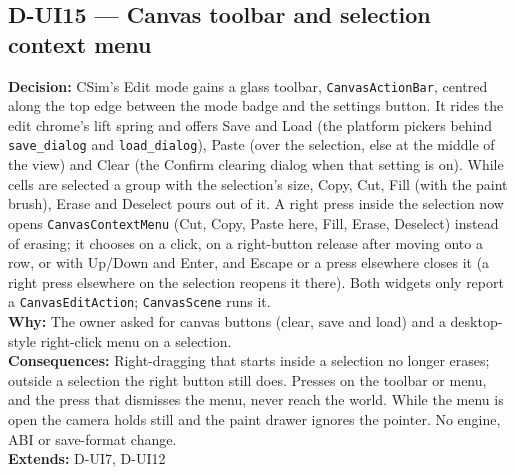 \subsection*{D-UI15 --- Canvas toolbar and selection context menu}
\begin{decisionbox}[title={D-UI15 \quad 2026-09-27}]
\textbf{Decision:} CSim's Edit mode gains a glass toolbar,
\texttt{CanvasActionBar}, centred along the top edge between the mode badge
and the settings button. It rides the edit chrome's lift spring and offers
Save and Load (the platform pickers behind \texttt{save\_dialog} and
\texttt{load\_dialog}), Paste (over the selection, else at the middle of the
view) and Clear (the Confirm clearing dialog when that setting is on). While
cells are selected a group with the selection's size, Copy, Cut, Fill (with the
paint brush), Erase and Deselect pours out of it. A right press inside the
selection now opens \texttt{CanvasContextMenu} (Cut, Copy, Paste here, Fill,
Erase, Deselect) instead of erasing; it chooses on a click, on a right-button
release after moving onto a row, or with Up/Down and Enter, and Escape or a
press elsewhere closes it (a right press elsewhere on the selection reopens it
there). Both widgets only report a \texttt{CanvasEditAction};
\texttt{CanvasScene} runs it.\\
\textbf{Why:} The owner asked for canvas buttons (clear, save and load) and a
desktop-style right-click menu on a selection.\\
\textbf{Consequences:} Right-dragging that starts inside a selection no longer
erases; outside a selection the right button still does. Presses on the
toolbar or menu, and the press that dismisses the menu, never reach the world.
While the menu is open the camera holds still and the paint drawer ignores
the pointer. No engine, ABI or save-format change.\\
\textbf{Extends:} D-UI7, D-UI12
\end{decisionbox}

